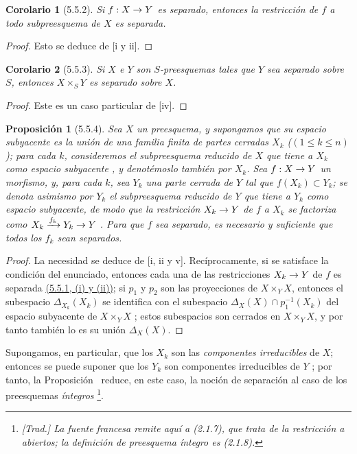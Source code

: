 \documentclass[oneside]{amsart}
\theoremstyle{ega-env-style}
\theoremstyle{ega-thm-env-style}
\newtheorem*{proposition}{Proposición}
\newtheorem*{corollary}{Corolario}
\theoremstyle{ega-defn-env-style}
\def\leq{\leqslant}                 %
\renewcommand{\to}{\mathchoice{\longrightarrow}{\rightarrow}{\rightarrow}{\rightarrow}}
\let\EGAOriginalLabel\label
\renewcommand{\label}[1]{\phantomsection\EGAOriginalLabel{#1}}
\begin{document}
\begin{corollary}[5.5.2]
\label{I.5.5.2}
Si $f:X\to Y$ es separado, entonces la restricción de $f$ a todo subpreesquema de $X$ es separada.
\end{corollary}

\begin{proof}
Esto se deduce de [i y ii].
\end{proof}

\begin{corollary}[5.5.3]
\label{I.5.5.3}
Si $X$ e $Y$ son $S$-preesquemas tales que $Y$ sea separado sobre $S$, entonces $X\times_S Y$ es separado sobre $X$.
\end{corollary}

\begin{proof}
Este es un caso particular de [iv].
\end{proof}

\begin{proposition}[5.5.4]
\label{I.5.5.4}
Sea $X$ un preesquema, y supongamos que su espacio subyacente es la unión de una familia \emph{finita} de partes cerradas $X_k$ ($(1\leq k\leq n)$);
para cada $k$, consideremos el subpreesquema reducido de $X$ que tiene a $X_k$ como espacio subyacente , y denotémoslo también por $X_k$.
Sea $f:X\to Y$ un morfismo, y, para cada $k$, sea $Y_k$ una parte cerrada de $Y$ tal que $f(X_k)\subset Y_k$;
se denota asimismo por $Y_k$ el subpreesquema reducido de $Y$ que tiene a $Y_k$ como espacio subyacente, de modo que la restricción $X_k\to Y$ de $f$ a $X_k$ se factoriza como $X_k\xrightarrow{f_k}Y_k\to Y$ .
Para que $f$ sea separado, es necesario y suficiente que todos los $f_k$ sean separados.
\end{proposition}

\begin{proof}
La necesidad se deduce de [i, ii y v].
Recíprocamente, si se satisface la condición del enunciado, entonces cada una de las restricciones $X_k\to Y$ de $f$ es separada \hyperref[I.5.5.1]{(5.5.1, (i) y (ii))};
si $p_1$ y $p_2$ son las proyecciones de $X\times_Y X$, entonces el subespacio $\Delta_{X_k}(X_k)$ se identifica con el subespacio $\Delta_X(X)\cap p_1^{-1}(X_k)$ del espacio subyacente de $X\times_Y X$ ;
estos subespacios son cerrados en $X\times_Y X$, y por tanto también lo es su unión $\Delta_X(X)$.
\end{proof}

Supongamos, en particular, que los $X_k$ son las \emph{componentes irreducibles} de $X$;
entonces se puede suponer que los $Y_k$ son componentes irreducibles de $Y$ ;
por tanto, la Proposición~ reduce, en este caso, la noción de separación al caso de los preesquemas \emph{íntegros} \footnote{\emph{[Trad.] La fuente francesa remite aquí a (2.1.7), que trata de la restricción a abiertos; la definición de preesquema íntegro es (2.1.8).}}.
\end{document}
